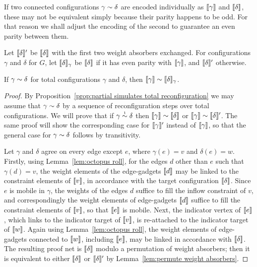 \documentclass{sigplanconf}
\begin{document}
If two connected configurations $\gamma\perm\delta$ are encoded individually as $\llbracket\gamma\rrbracket$ and $\llbracket\delta\rrbracket$, these may not be equivalent simply because their parity happens to be odd.
%
For that reason we shall adjust the encoding of the second to guarantee an even parity between them.

\begin{definition}
%
Let $\llbracket\delta\rrbracket'$ be $\llbracket\delta\rrbracket$ with the first two weight absorbers exchanged.
%
For configurations $\gamma$ and $\delta$ for $G$, let $\llbracket\delta\rrbracket_\gamma$ be $\llbracket\delta\rrbracket$ if it has even parity with $\llbracket\gamma\rrbracket$, and $\llbracket\delta\rrbracket'$ otherwise.
%
\end{definition}



\begin{lemma}
\label{lem:completeness}
If $\gamma\perm\delta$ for total configurations $\gamma$ and $\delta$, then $\itn\gamma\perm\itn\delta_\gamma$.
\end{lemma}

\begin{proof}
By Proposition~\ref{prop:partial simulates total reconfiguration} we may assume that $\gamma\perm\delta$ by a sequence of reconfiguration steps over total configurations.
%
We will prove that if $\gamma\perm*\delta$ then $\itn\gamma\perm\itn\delta$ or $\itn\gamma\perm\itn\delta'$.
%
The same proof will show the corresponding case for $\llbracket\gamma\rrbracket'$ instead of $\llbracket\gamma\rrbracket$, so that the general case for $\gamma\perm\delta$ follows by transitivity.



Let $\gamma$ and $\delta$ agree on every edge except $e$, where $\gamma(e)=v$ and $\delta(e)=w$.
%
Firstly, using Lemma~\ref{lem:octopus roll}, for the edges $d$ other than $e$ such that $\gamma(d)=v$, the weight elements of the edge-gadgets $\llbracket d\rrbracket$ may be linked to the constraint elements of $\llbracket v\rrbracket$, in accordance with the target configuration $\llbracket\delta\rrbracket$.
%
Since $e$ is mobile in $\gamma$, the weights of the edges $d$ suffice to fill the inflow constraint of $v$, and correspondingly the weight elements of edge-gadgets $\llbracket d\rrbracket$ suffice to fill the constraint elements of $\llbracket v\rrbracket$, so that $\llbracket e\rrbracket$ is mobile.
%
Next, the indicator vertex of $\llbracket e\rrbracket$, which links to the indicator target of $\llbracket v\rrbracket$, is re-attached to the indicator target of $\llbracket w\rrbracket$.
%
Again using Lemma~\ref{lem:octopus roll}, the weight elements of edge-gadgets connected to $\llbracket w\rrbracket$, including $\llbracket e\rrbracket$, may be linked in accordance with $\llbracket\delta\rrbracket$.
%
The resulting proof net is $\llbracket\delta\rrbracket$ modulo a permutation of weight absorbers; then it is equivalent to either $\llbracket\delta\rrbracket$ or $\llbracket\delta\rrbracket'$ by Lemma~\ref{lem:permute weight absorbers}.
\end{proof}
\end{document}
